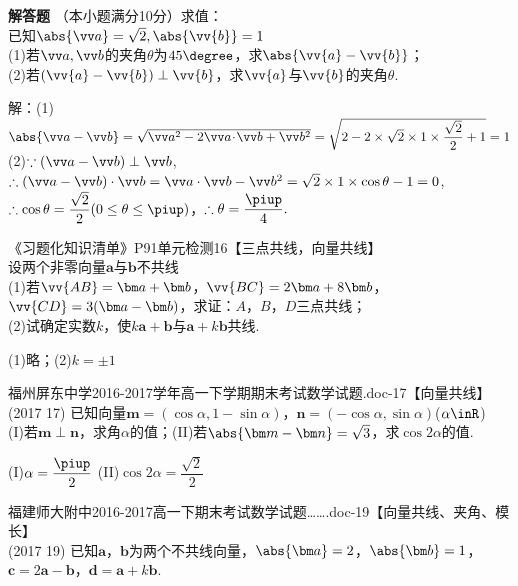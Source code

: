 \begin{exercise}{\bf 解答题}
      （本小题满分10分）求值：\\
      已知$\abs{\vv a}=\sqrt2,\abs{\vv{\mathstrut b}}=1$\\
      (1)若$\vv a,\vv b$的夹角$\theta$为$45\degree$，求$\abs{\vv{\mathstrut a}-\vv{\mathstrut b}}$；\\
      (2)若$(\vv{\mathstrut a}-\vv{\mathstrut b})\perp \vv{\mathstrut b}$，求$\vv{\mathstrut a}$与$\vv{\mathstrut b}$的夹角$\theta$.
      \begin{answer}
        解：(1) $\abs{\vv a-\vv b}=\sqrt{\vv a^2-2\vv a\!\cdot\!\vv b+\vv b^2}=\sqrt{2-2\times\sqrt2\times1\times\dfrac{\sqrt2}2+1}=1$\fz[5]
        (2)$\because(\vv a-\vv b)\perp\vv b$,\\
        $\therefore(\vv a-\vv b)\cdot\vv b=\vv a\cdot\vv b-\vv b^2=\sqrt2\times1\times\cos\theta-1=0$,\\
        $\therefore\cos\theta=\dfrac{\sqrt2}2(0\le\theta\le\piup)$，$\therefore\theta=\dfrac{\piup}4.$\fz[10]
      \end{answer}
    \item 《习题化知识清单》P91单元检测16【三点共线，向量共线】\\
      设两个非零向量$\bm a$与$\bm b$不共线\\
      (1)若$\vv{AB}=\bm a+\bm b$，$\vv{BC}=2\bm a+8\bm b$，$\vv{CD}=3(\bm a-\bm b)$，求证：$A$，$B$，$D$三点共线；\\
      (2)试确定实数$k$，使$k\bm a+\bm b$与$\bm a+k\bm b$共线.
      \begin{answer}
        (1)略；(2)$k=\pm1$
      \end{answer}
    \item 福州屏东中学2016-2017学年高一下学期期末考试数学试题.doc-17【向量共线】\\
      (2017  17)
      已知向量$\bm m=(\cos\alpha,1-\sin\alpha)$，$\bm n=(-\cos\alpha,\sin\alpha)$($\alpha\inR$)\\
      (I)若$\bm m\perp\bm n$，求角$\alpha$的值；\qquad (II)若$\abs{\bm m-\bm n}=\sqrt3$，求$\cos{2\alpha}$的值.
      \begin{answer}
        (I)$\alpha=\dfrac{\piup}2$
        (II)$\cos{2\alpha}=\dfrac{\sqrt2}2$
      \end{answer}
    \item 福建师大附中2016-2017高一下期末考试数学试题…….doc-19【向量共线、夹角、模长】\\
      (2017  19)
      已知$\bm a$，$\bm b$为两个不共线向量，$\abs{\bm a}=2$，$\abs{\bm b}=1$，$\bm c=2\bm a-\bm b$，$\bm d=\bm a+k\bm b$.\\

\end{exercise}
